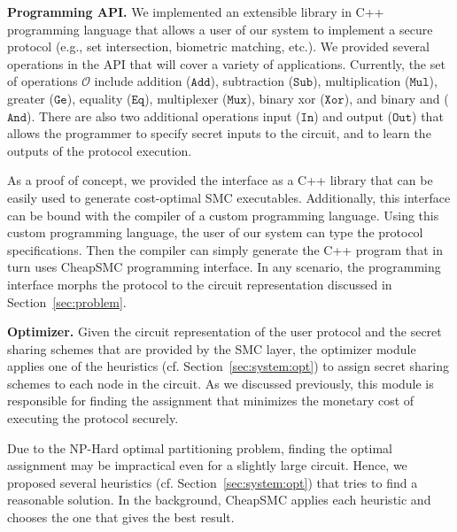 \documentclass{llncs}
\newcommand{\sysname}{{CheapSMC}\xspace}
\begin{document}
\textbf{Programming API.} We implemented an extensible library in C++ programming language that allows a user of our system to implement a secure protocol (e.g., set intersection, biometric matching, etc.). We provided several operations in the API that will cover a variety of applications. Currently, the set of operations $\mathcal{O}$ include addition ($\mathtt{Add}$), subtraction ($\mathtt{Sub}$), multiplication ($\mathtt{Mul}$), greater ($\mathtt{Ge}$), equality ($\mathtt{Eq}$), multiplexer ($\mathtt{Mux}$), binary xor ($\mathtt{Xor}$), and binary and ($\mathtt{And}$). There are also two additional operations input ($\mathtt{In}$) and output ($\mathtt{Out}$) that allows the programmer to specify secret inputs to the circuit, and to learn the outputs of the protocol execution. 

As a proof of concept, we provided the interface as a C++ library that can be easily used to generate cost-optimal SMC executables. Additionally, this interface can be bound with the compiler of a custom programming language. Using this custom programming language, the user of our system can type the protocol specifications. Then the compiler can simply generate the C++ program that in turn uses \sysname programming interface. In any scenario, the programming interface morphs the protocol to the circuit representation discussed in Section~\ref{sec:problem}. 

\textbf{Optimizer.} Given the circuit representation of the user protocol and the secret sharing schemes that are provided by the SMC layer, the optimizer module applies one of the heuristics (cf. Section~\ref{sec:system:opt}) to assign secret sharing schemes to each node in the circuit. As we discussed previously, this module is responsible for finding the assignment that minimizes the monetary cost of executing the protocol securely. 

Due to the NP-Hard optimal partitioning problem, finding the optimal assignment may be impractical even for a slightly large circuit. Hence, we proposed several heuristics (cf. Section~\ref{sec:system:opt}) that tries to find a reasonable solution. In the background, \sysname applies each heuristic and chooses the one that gives the best result. 
\end{document}
